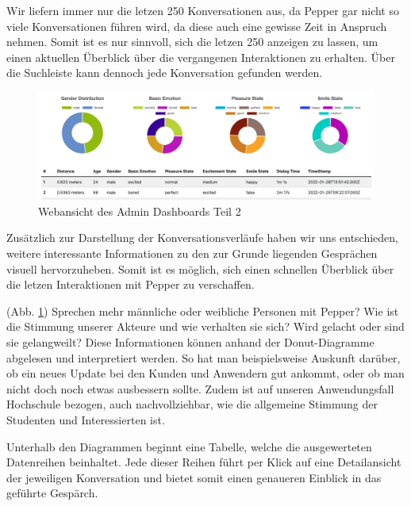 Wir liefern immer nur die letzen 250 Konversationen aus, da Pepper gar nicht so viele Konversationen führen wird, da diese auch eine gewisse Zeit in Anspruch nehmen. Somit ist es nur sinnvoll, sich die letzen 250 anzeigen zu lassen, um einen aktuellen Überblick über die vergangenen Interaktionen zu erhalten. Über die Suchleiste kann dennoch jede Konversation gefunden werden.\\


\begin{figure}[H]
    \includegraphics[width=\textwidth]{Figures/NodeChapter/adminDashboard2.png}
    \caption{Webansicht des Admin Dashboards Teil 2}
    \label{fig:admindashboard2}
    \centering
\end{figure}

Zusätzlich zur Darstellung der Konversationsverläufe haben wir uns entschieden, weitere interessante Informationen zu den zur Grunde liegenden Gesprächen visuell hervorzuheben. Somit ist es möglich, sich einen schnellen Überblick
über die letzen Interaktionen mit Pepper zu verschaffen.

(Abb. \ref{fig:admindashboard2}) Sprechen mehr männliche oder weibliche Personen
mit Pepper? Wie ist die Stimmung unserer Akteure und wie verhalten sie sich? Wird gelacht oder sind sie gelangweilt? Diese Informationen können anhand der Donut-Diagramme abgelesen und interpretiert werden. So hat man beispielsweise Auskunft darüber, ob ein neues Update bei den Kunden und Anwendern gut ankommt, oder ob man nicht doch noch etwas ausbessern sollte. Zudem ist auf unseren Anwendungsfall Hochschule bezogen, auch nachvollziehbar, wie die allgemeine Stimmung der Studenten und Interessierten ist.

Unterhalb den Diagrammen beginnt eine Tabelle, welche die ausgewerteten Datenreihen beinhaltet. Jede dieser Reihen führt per Klick auf eine Detailansicht der jeweiligen Konversation und bietet somit einen genaueren Einblick in das geführte
Gespärch.

